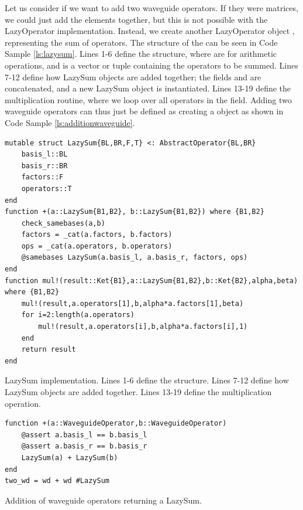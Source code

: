 Let us consider if we want to add two waveguide operators. If they were matrices, we could just add the elements together, but this is not possible with the LazyOperator implementation. Instead, we create another LazyOperator object , representing the sum of operators. The structure of the  can be seen in 
Code Sample \ref{ls:lazysum}. Lines 1-6 define the structure, where  are for arithmetic operations, and  is a vector or tuple containing the operators to be summed. Lines 7-12 define how LazySum objects are added together; the fields  and  are concatenated, and a new LazySum object is instantiated. Lines 13-19 define the multiplication routine, where we loop over all operators in the  field. Adding two waveguide operators can thus just be defined as creating a  object as shown in Code Sample \ref{ls:additionwaveguide}.

\begin{listing}[H]
\begin{verbatim}
mutable struct LazySum{BL,BR,F,T} <: AbstractOperator{BL,BR}
    basis_l::BL
    basis_r::BR
    factors::F
    operators::T
end
function +(a::LazySum{B1,B2}, b::LazySum{B1,B2}) where {B1,B2}
    check_samebases(a,b)
    factors = _cat(a.factors, b.factors)
    ops = _cat(a.operators, b.operators)
    @samebases LazySum(a.basis_l, a.basis_r, factors, ops)
end
function mul!(result::Ket{B1},a::LazySum{B1,B2},b::Ket{B2},alpha,beta) where {B1,B2}
    mul!(result,a.operators[1],b,alpha*a.factors[1],beta)
    for i=2:length(a.operators)
        mul!(result,a.operators[i],b,alpha*a.factors[i],1)
    end
    return result
end
\end{verbatim}
\caption{LazySum implementation. Lines 1-6 define the structure. Lines 7-12 define how LazySum objects are added together. Lines 13-19 define the multiplication operation.}
\label{ls:lazysum}
\end{listing}

\begin{listing}[H]
\begin{verbatim}
function +(a::WaveguideOperator,b::WaveguideOperator)
    @assert a.basis_l == b.basis_l
    @assert a.basis_r == b.basis_r
    LazySum(a) + LazySum(b)
end
two_wd = wd + wd #LazySum
\end{verbatim}
\caption{Addition of waveguide operators returning a LazySum. }
\label{ls:additionwaveguide}
\end{listing}

